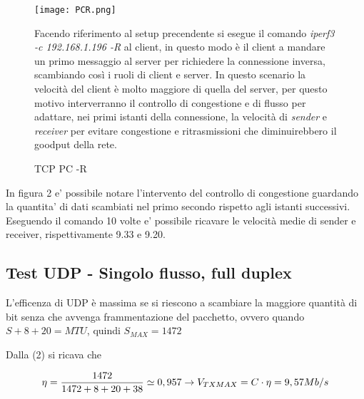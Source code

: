 \documentclass[../lab2.tex]{subfiles}
\begin{document}
            \begin{figure}[!htb]
                \begin{minipage}{0.48\textwidth}
                    \centering
                    \texttt{[image: PCR.png]}
                    \vspace{-20pt}
                    \caption{TCP PC -R}\label{TCPPCR}
                \end{minipage}\hfill
                \begin{minipage}{0.48\textwidth}
                    Facendo riferimento al setup precendente si esegue il comando \textit{iperf3 -c 192.168.1.196 -R}
                    al client, in questo modo è il client a mandare un primo messaggio al server per richiedere la connessione inversa, scambiando così i ruoli 
                    di client e server.
                    In questo scenario la velocità del client è molto maggiore di quella del server, per questo motivo interverranno 
                    il controllo di congestione e di flusso per adattare, nei primi istanti della connessione, la velocità di 
                    \textit{sender} e \textit{receiver} per evitare congestione e ritrasmissioni che diminuirebbero il goodput della rete.
                \end{minipage}
            \end{figure}

            In figura 2 e' possibile notare l'intervento del controllo di congestione guardando la quantita' di dati scambiati nel primo secondo rispetto agli istanti 
            successivi. Eseguendo il comando 10 volte e' possibile ricavare le velocità medie di sender e receiver, rispettivamente 9.33 e 9.20.
            
    \subsection{Test UDP - Singolo flusso, full duplex}

            L'efficenza di UDP è massima se si riescono a scambiare la maggiore quantità di bit senza che avvenga frammentazione del pacchetto,
            ovvero quando $S+8+20 = MTU$, quindi $S_{MAX} = 1472$

            Dalla (2) si ricava che 
            
            \begin{equation}
                \centering
                \eta = \frac{1472}{1472+8+20+38} \simeq 0,957 \rightarrow  V_{TXMAX} = C \cdot \eta = 9,57 Mb/s
            \end{equation}
\end{document}
